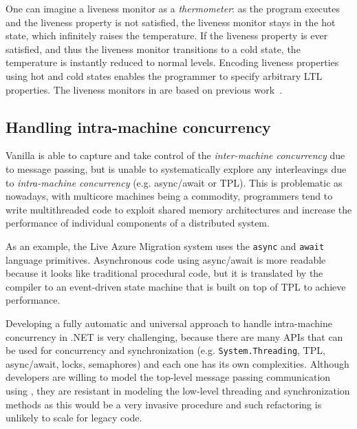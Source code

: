 One can imagine a liveness monitor as a \emph{thermometer}: as the program executes and the liveness property is not satisfied, the liveness monitor stays in the hot state, which infinitely raises the temperature. If the liveness property is ever satisfied, and thus the liveness monitor transitions to a cold state, the temperature is instantly reduced to normal levels. Encoding liveness properties using hot and cold states enables the programmer to specify arbitrary LTL properties. The liveness monitors in \psharp are based on previous work~\cite{?}.


\subsection{Handling intra-machine concurrency}
\label{sec:psharp:async}

Vanilla \psharp is able to capture and take control of the \emph{inter-machine concurrency} due to message passing, but is unable to systematically explore any interleavings due to \emph{intra-machine concurrency} (e.g. async/await or TPL). This is problematic as nowadays, with multicore machines being a commodity, programmers tend to write multithreaded code to exploit shared memory architectures and increase the performance of individual components of a distributed system.

As an example, the Live Azure Migration system uses the \texttt{async} and \texttt{await} \csharp {} language primitives. Asynchronous code using async/await is more readable because it looks like traditional procedural code, but it is translated by the compiler to an event-driven state machine that is built on top of TPL to achieve performance.


Developing a fully automatic and universal approach to handle intra-machine concurrency in .NET is very challenging, because there are many APIs that can be used for concurrency and synchronization (e.g. \texttt{System.Threading}, TPL, async/await, locks, semaphores) and each one has its own complexities. Although developers are willing to model the top-level message passing communication using \psharp, they are resistant in modeling the low-level threading and synchronization methods as this would be a very invasive procedure and such refactoring is unlikely to scale for legacy code.

